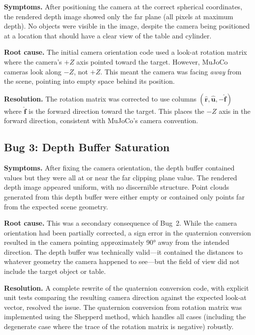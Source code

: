 \documentclass[11pt,a4paper]{report}
\begin{document}
\textbf{Symptoms.} After positioning the camera at the correct spherical coordinates, the rendered depth image showed only the far plane (all pixels at maximum depth). No objects were visible in the image, despite the camera being positioned at a location that should have a clear view of the table and cylinder.

\textbf{Root cause.} The initial camera orientation code used a look-at rotation matrix where the camera's $+Z$ axis pointed toward the target. However, MuJoCo cameras look along $-Z$, not $+Z$. This meant the camera was facing \emph{away} from the scene, pointing into empty space behind its position.

\textbf{Resolution.} The rotation matrix was corrected to use columns $(\hat{\mathbf{r}}, \hat{\mathbf{u}}, -\hat{\mathbf{f}})$ where $\hat{\mathbf{f}}$ is the forward direction toward the target. This places the $-Z$ axis in the forward direction, consistent with MuJoCo's camera convention.

\subsection{Bug 3: Depth Buffer Saturation}
\label{sec:bug_depth}

\textbf{Symptoms.} After fixing the camera orientation, the depth buffer contained values but they were all at or near the far clipping plane value. The rendered depth image appeared uniform, with no discernible structure. Point clouds generated from this depth buffer were either empty or contained only points far from the expected scene geometry.

\textbf{Root cause.} This was a secondary consequence of Bug~2. While the camera orientation had been partially corrected, a sign error in the quaternion conversion resulted in the camera pointing approximately 90° away from the intended direction. The depth buffer was technically valid---it contained the distances to whatever geometry the camera happened to see---but the field of view did not include the target object or table.

\textbf{Resolution.} A complete rewrite of the quaternion conversion code, with explicit unit tests comparing the resulting camera direction against the expected look-at vector, resolved the issue. The quaternion conversion from rotation matrix was implemented using the Shepperd method, which handles all cases (including the degenerate case where the trace of the rotation matrix is negative) robustly.
\end{document}
